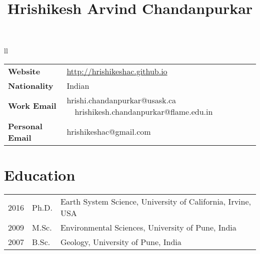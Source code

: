 ll\documentclass[10pt]{article}
\begin{document}
\title{\centerline{Hrishikesh Arvind Chandanpurkar}}

\author{}


\date{\rightline{\today}}


\begingroup
\let\center\flushleft
\let\endcenter\endflushleft
\maketitle
\endgroup


\sloppy


\begin{tabular}{ l l }
{\bf Website}& \href{http://hrishikeshac.github.io}{http://hrishikeshac.github.io} \\ 
{\bf Nationality} & Indian \\
{\bf Work Email} & hrishi.chandanpurkar@usask.ca \ \ hrishikesh.chandanpurkar@flame.edu.in \\
{\bf Personal Email} & hrishikeshac@gmail.com \\
\end{tabular} 

\section*{Education}
\hline
\label{education}
\begin{tabular}{ l l l }
2016 & Ph.D. & Earth System Science, University of California, Irvine, USA\\ 
2009 & M.Sc. & Environmental Sciences, University of Pune, India\\ 
2007 & B.Sc. & Geology, University of Pune, India\\ 
\end{tabular} 
\end{document}
